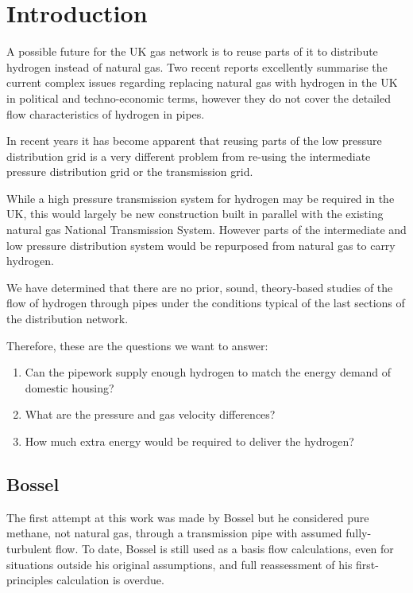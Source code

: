 \documentclass[5p]{elsarticle} %
\begin{document}
\section{Introduction}

A possible future for the UK gas network is to reuse parts of it to distribute hydrogen instead of natural gas\citep{dodds2013}. 
Two recent reports\citep{RoyalAcademyofEngineering2022, ARUP2023} excellently summarise the current complex issues regarding replacing natural gas with hydrogen in the UK in political and techno-economic terms, however they do not cover the detailed flow characteristics of hydrogen in pipes.

In recent years it has become apparent that reusing parts of the low pressure distribution grid is a very different problem from re-using the intermediate pressure distribution grid or the transmission grid\citep{H2Blends21,natgas2023}.

While a high pressure transmission system for hydrogen may be required in the UK\citep{Samsatli2019}, this would largely be new construction built in parallel with the existing natural gas National Transmission System. 
However parts of the intermediate and low pressure distribution system would be repurposed from natural gas to carry hydrogen. 

We have determined that there are no prior, sound, theory-based studies of the flow of hydrogen through pipes under the conditions typical of the last sections of the distribution network.

Therefore, these are the questions we want to answer:
\begin{enumerate}
\item Can the pipework supply enough hydrogen to match the energy demand of domestic housing?
\item What are the pressure and gas velocity differences?
\item How much extra energy would be required to deliver the hydrogen?
\end{enumerate}

\subsection{Bossel}

The first attempt at this work was made by Bossel\citep{bossel2006} but he considered pure methane, not natural gas, through a transmission pipe with assumed fully-turbulent flow. 
To date, Bossel is still used\citep{Ibrahim2022} as a basis flow calculations, even for situations outside his original assumptions, and full reassessment of his first-principles calculation is overdue.
\end{document}
